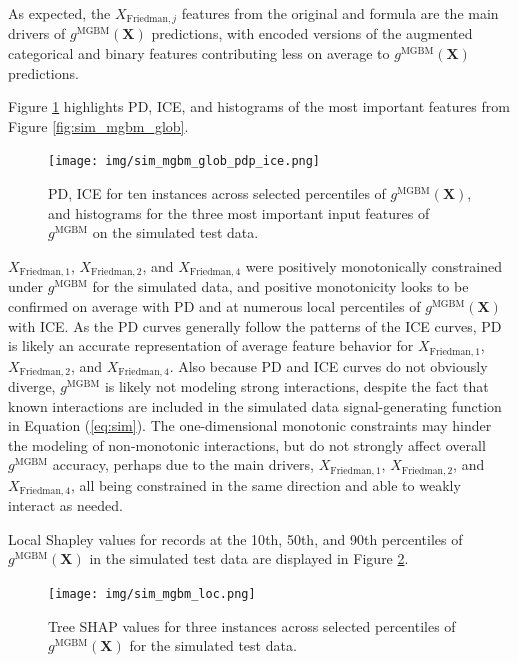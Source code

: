 \documentclass[information,article,accept,moreauthors,pdftex]{Definitions/mdpi}
\begin{document}
{As expected, the $X_{\text{Friedman},j}$ features from the original \citet{friedman1979tree} and \citet{friedman1991multivariate} formula are the main drivers of $g^\text{MGBM}(\mathbf{X})$ predictions, with encoded versions of the augmented categorical and binary features contributing less on average to $g^\text{MGBM}(\mathbf{X})$ predictions. 

Figure \ref{fig:sim_mgbm_glob_pdp_ice} highlights PD, ICE, and histograms of the most important features from Figure \ref{fig:sim_mgbm_glob}. 

\begin{figure}[H]
	\centering
	\texttt{[image: img/sim\_mgbm\_glob\_pdp\_ice.png]}
	\caption{PD, ICE for ten instances across selected percentiles of $g^\text{MGBM}(\mathbf{X})$, and histograms for the three most important input features of $g^\text{MGBM}$ on the simulated test data.}
	\label{fig:sim_mgbm_glob_pdp_ice}
\end{figure}   

$X_{\text{Friedman},1}$, $X_{\text{Friedman},2}$, and $X_{\text{Friedman},4}$ were positively monotonically constrained under $g^\text{MGBM}$ for the simulated data, and positive monotonicity looks to be confirmed on average with PD and at numerous local percentiles of $g^\text{MGBM}(\mathbf{X})$ with ICE. As the PD curves generally follow the patterns of the ICE curves, PD is likely an accurate representation of average feature behavior for $X_{\text{Friedman},1}$, $X_{\text{Friedman},2}$, and $X_{\text{Friedman},4}$. Also because PD and ICE curves do not obviously diverge, $g^\text{MGBM}$ is likely not modeling strong interactions, despite the fact that known interactions are included in the simulated data signal-generating function in Equation (\ref{eq:sim}). The one-dimensional monotonic constraints may hinder the modeling of non-monotonic interactions, but do not strongly affect overall $g^\text{MGBM}$ accuracy, perhaps due to the main drivers, $X_{\text{Friedman},1}$, $X_{\text{Friedman},2}$, and $X_{\text{Friedman},4}$, all being constrained in the same direction and able to weakly interact as needed.

Local Shapley values for records at the 10{th}, 50{th}, and 90{th} percentiles of $g^\text{MGBM}(\mathbf{X})$ in the simulated test data are displayed in Figure \ref{fig:sim_mgbm_loc}. 

\begin{figure}[H]
	\centering
	\texttt{[image: img/sim\_mgbm\_loc.png]}
	\caption{Tree SHAP values for three instances across selected percentiles of $g^\text{MGBM}(\mathbf{X})$ for the simulated test data.}
	\label{fig:sim_mgbm_loc}
\end{figure}   

}
\end{document}
